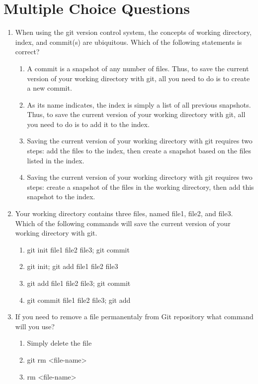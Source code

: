 \documentclass[11pt,a4paper]{article}
\begin{document}
\section*{Multiple Choice Questions}
\begin{enumerate}
    \item When using the git version control system, the concepts of working directory, index, and commit(s) are ubiquitous. Which of the following statements is correct?
    \begin{enumerate}
	\item A commit is a snapshot of any number of files. Thus, to save the current version of your working directory with git, all you need to do is to create a new commit.
	\item  As its name indicates, the index is simply a list of all previous snapshots. Thus, to save the current version of your working directory with git, all you need to do is to add it to the index.
	\item Saving the current version of your working directory with git requires two steps: add the files to the index, then create a snapshot based on the files listed in the index.
	\item Saving the current version of your working directory with git requires two steps: create a snapshot of the files in the working directory, then add this snapshot to the index.
    \end{enumerate}
    \item Your working directory contains three files, named file1, file2, and file3. Which of the following commands will save the current version of your working directory with git.
    \begin{enumerate}
    \item git init file1 file2 file3; git commit
    \item git init; git add file1 file2 file3
    \item git add file1 file2 file3; git commit
    \item git commit file1 file2 file3; git add
    \end{enumerate}
    \item  If you need to remove a file permanentaly from Git repository what command will you use?
    \begin{enumerate}
    \item Simply delete the file
    \item git rm \textless file-name\textgreater
    \item rm \textless file-name\textgreater

\end{enumerate}
\end{enumerate}
\end{document}
